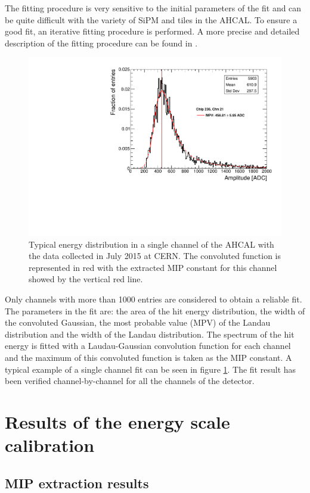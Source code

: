 The fitting procedure is very sensitive to the initial parameters of the fit and can be quite difficult with the variety of SiPM and tiles in the AHCAL. To ensure a good fit, an iterative fitting procedure is performed. A more precise and detailed description of the fitting procedure can be found in \cite{FabianThesis, SarahMaster}.

\begin{figure}[htbp!]
	\centering
	\includegraphics[width=0.6\linewidth]{../Thesis_Plots/EnergyCalib/Plots/ExampleMIP_Module3.pdf}
	\caption{Typical energy distribution in a single channel of the AHCAL with the data collected in July 2015 at CERN. The convoluted function is represented in red with the extracted MIP constant for this channel showed by the vertical red line.} \label{fig:MIPFit}
\end{figure}

Only channels with more than 1000 entries are considered to obtain a reliable fit. The parameters in the fit are: the area of the hit energy distribution, the width of the convoluted Gaussian, the most probable value (MPV) of the Landau distribution and the width of the Landau distribution. The spectrum of the hit energy is fitted with a Laudau-Gaussian convolution function for each channel and the maximum of this convoluted function is taken as the MIP constant. A typical example of a single channel fit can be seen in figure \ref{fig:MIPFit}. The fit result has been verified channel-by-channel for all the channels of the detector.

\section{Results of the energy scale calibration}

\subsection{MIP extraction results}

